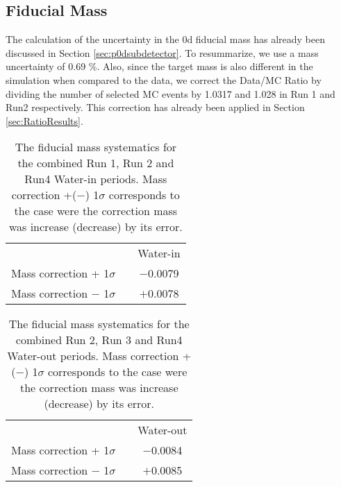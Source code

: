 \subsection{Fiducial Mass}
\label{sec:Systematics_FiducialMass}

The calculation of the uncertainty in the \p0d fiducial mass 
has already been discussed in Section \ref{sec:p0dsubdetector}. 
To resummarize, we use a mass uncertainty of 0.69 \%. 
Also, since the target mass is also different in the simulation 
when compared to the data, we correct the Data/MC Ratio by dividing the number of selected MC events by 1.0317 and 1.028 in Run 1 and Run2 respectively. 
This correction has already been applied 
in Section \ref{sec:RatioResults}.

\begin{table}[h]
\centering
\begin{tabular}{ccc}\toprule
 & & Water-in \\
\cline{3-3}
Mass correction + 1$\sigma$ & & $-$0.0079 \\
Mass correction $-$ 1$\sigma$ & & $+$0.0078 \\
\bottomrule
\end{tabular} 
\caption{The fiducial mass systematics for the combined 
Run 1, Run 2 and Run4 Water-in periods. 
Mass correction +($-$) 1$\sigma$ corresponds to the case were 
the correction mass was increase (decrease) by its error. }
\label{tab:FMassSystematicsWaterIn}
\end{table}

\begin{table}[h]
\centering
\begin{tabular}{ccc}\toprule
 & & Water-out \\
\cline{3-3}
Mass correction + 1$\sigma$ & & $-$0.0084 \\
Mass correction $-$ 1$\sigma$ & & $+$0.0085 \\
\bottomrule
\end{tabular} 
\caption{The fiducial mass systematics for the combined 
Run 2, Run 3 and Run4 Water-out periods. 
Mass correction +($-$) 1$\sigma$ corresponds to the case were 
the correction mass was increase (decrease) by its error. }
\label{tab:FMassSystematicsWaterOut}
\end{table}
